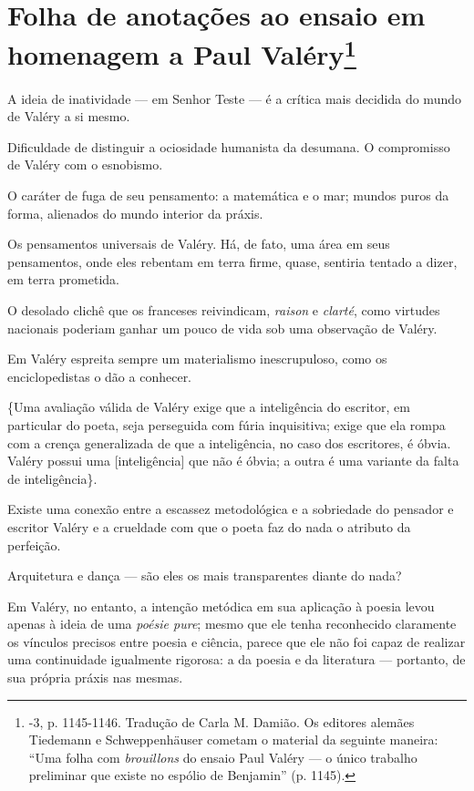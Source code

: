 \chapter{Folha de anotações ao ensaio em homenagem a Paul Valéry\footnote[*]{-3, p. 1145-1146. Tradução de Carla M. Damião. Os
  editores alemães Tiedemann e Schweppenhäuser cometam o material da
  seguinte maneira: ``Uma folha com \emph{brouillons} do ensaio Paul
  Valéry --- o único trabalho preliminar que existe no espólio de
  Benjamin'' (p. 1145).}}

A ideia de inatividade --- em Senhor Teste --- é a crítica mais decidida do
mundo de Valéry a si mesmo.

Dificuldade de distinguir a ociosidade humanista da desumana. O
compromisso de Valéry com o esnobismo.

O caráter de fuga de seu pensamento: a matemática e o mar; mundos puros
da forma, alienados do mundo interior da práxis.

Os pensamentos universais de Valéry. Há, de fato, uma área em seus
pensamentos, onde eles rebentam em terra firme, quase, sentiria tentado
a dizer, em terra prometida.

O desolado clichê que os franceses reivindicam, \emph{raison} e
\emph{clarté}, como virtudes nacionais poderiam ganhar um pouco de vida
sob uma observação de Valéry.

Em Valéry espreita sempre um materialismo inescrupuloso, como os
enciclopedistas o dão a conhecer.

\{Uma avaliação válida de Valéry exige que a inteligência do escritor,
em particular do poeta, seja perseguida com fúria inquisitiva; exige que
ela rompa com a crença generalizada de que a inteligência, no caso dos
escritores, é óbvia. Valéry possui uma {[}inteligência{]} que não é
óbvia; a outra é uma variante da falta de inteligência\}.

Existe uma conexão entre a escassez metodológica e a sobriedade do
pensador e escritor Valéry e a crueldade com que o poeta faz do nada o
atributo da perfeição.

Arquitetura e dança --- são eles os mais transparentes diante do nada?

Em Valéry, no entanto, a intenção metódica em sua aplicação à poesia
levou apenas à ideia de uma \emph{poésie pure}; mesmo que ele tenha
reconhecido claramente os vínculos precisos entre poesia e ciência,
parece que ele não foi capaz de realizar uma continuidade igualmente
rigorosa: a da poesia e da literatura --- portanto, de sua própria práxis
nas mesmas.

